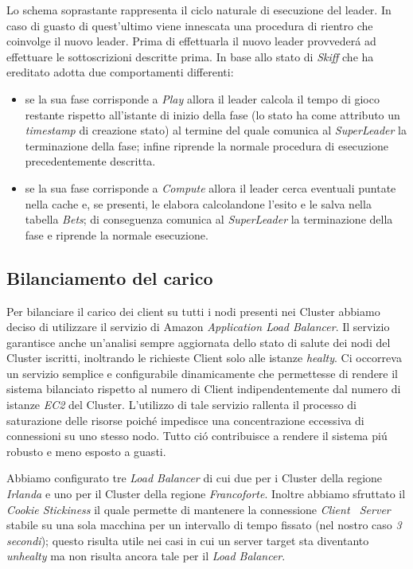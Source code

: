 \documentclass{sig-alternate-05-2015}
\begin{document}
Lo schema soprastante rappresenta il ciclo naturale di esecuzione del leader. In caso di guasto di quest'ultimo viene innescata una procedura di rientro che coinvolge il nuovo leader. Prima di effettuarla il nuovo leader provveder\'a ad effettuare le sottoscrizioni descritte prima. In base allo stato di \textit{Skiff} che ha ereditato adotta due comportamenti differenti:
\begin{itemize}
\item se la sua fase corrisponde a \textit{Play} allora il leader calcola il tempo di gioco restante rispetto all'istante di inizio della fase (lo stato ha come attributo un \textit{timestamp} di creazione stato) al termine del quale comunica al \textit{SuperLeader} la terminazione della fase; infine riprende la normale procedura di esecuzione precedentemente descritta. 
\item se la sua fase corrisponde a \textit{Compute} allora il leader cerca eventuali puntate nella cache e, se presenti, le elabora calcolandone l'esito e le salva nella tabella \textit{Bets}; di conseguenza comunica al \textit{SuperLeader} la terminazione della fase e riprende la normale esecuzione. 
\end{itemize}

\subsection{Bilanciamento del carico}


Per bilanciare il carico dei client su tutti i nodi presenti nei Cluster abbiamo deciso di utilizzare il servizio di Amazon \textit{Application Load Balancer}. Il servizio garantisce anche un'analisi sempre aggiornata dello stato di salute dei nodi del Cluster iscritti, inoltrando le richieste Client solo alle istanze \textit{healty}.
Ci occorreva un servizio semplice e configurabile dinamicamente che permettesse di rendere il sistema bilanciato rispetto al numero di Client indipendentemente dal numero di istanze \textit{EC2} del Cluster. L'utilizzo di tale servizio rallenta il processo di saturazione delle risorse poich\'e impedisce una concentrazione eccessiva di connessioni su uno stesso nodo. Tutto ci\'o contribuisce a rendere il sistema pi\'u robusto e meno esposto a guasti.

Abbiamo configurato tre \textit{Load Balancer} di cui due per i Cluster della regione \textit{Irlanda} e uno per il Cluster della regione \textit{Francoforte}. Inoltre abbiamo sfruttato il \textit{Cookie Stickiness} il quale permette di mantenere la connessione \textit{Client \ Server} stabile su una sola macchina per un intervallo di tempo fissato (nel nostro caso \textit{3 secondi}); questo risulta utile nei casi in cui un server target sta diventanto \textit{unhealty} ma non risulta ancora tale per il \textit{Load Balancer}.   
\end{document}
